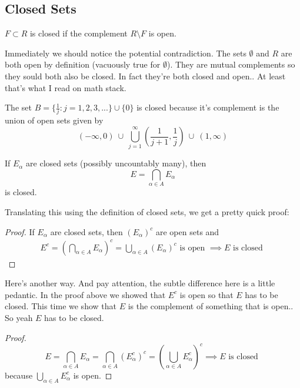 \documentclass{article}
\begin{document}
\pagebreak
\subsection*{Closed Sets}

\begin{definition}
    \( F \subset R \) is closed if the complement \( R \setminus F \) is open.
\end{definition}

Immediately we should notice the potential contradiction. The sets \( \emptyset \)
and \( R \) are both open by definition (vacuously true for \( \emptyset \)). 
They are mutual complements so they sould both also be closed. In fact
they're both closed and open.. At least that's what I read on math stack.

\begin{exmp}
    The set \( B = \{\frac{1}{j} : j = 1, 2, 3, ...\} \cup \{0\}\) is closed because it's 
    complement is the union of open sets given by
    \[
        (-\infty, 0) \ \cup  \ \bigcup_{j=1}^\infty (\frac{1}{j+1}, \frac{1}{j}) \ \cup  \ (1, \infty)
    \]
\end{exmp}

\begin{theorem}
    If \( E_\alpha \) are closed sets (possibly uncountably many), then
     \[
         E = \bigcap_{\alpha \in A} E_\alpha
    \] 
    is closed.
\end{theorem}

Translating this using the definition of closed sets, we get a pretty quick proof:
\begin{proof}
If \( E_\alpha \) are closed sets, then \( (E_\alpha)^c \) are open sets and
\begin{gather}
    E^c = (\bigcap_{\alpha \in A} E_\alpha)^c = \bigcup_{\alpha \in A} (E_\alpha)^c 
    \text{ is open } \implies E \text{ is closed }
\end{gather}
\end{proof}


Here's another way. And pay attention, the subtle difference here is a little pedantic.
In the proof above we showed that \( E^c \) is open so that  \( E \) has to be closed.
This time we show that \( E \) is the complement of something that is open.. So yeah \( E \) 
has to be closed.
\begin{proof}
    \[ 
        E = \bigcap_{\alpha \in A} E_\alpha = \bigcap_{\alpha \in A} (E_\alpha^c)^c 
        = (\bigcup_{\alpha \in A} E_\alpha^c)^c \implies E \text{ is closed }
    \]
    because \(\bigcup_{\alpha \in A} E_\alpha^c\) is open.
\end{proof}
\end{document}
